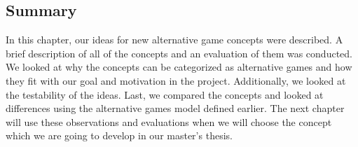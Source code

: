 \documentclass[../Main.tex]{subfiles}
\begin{document}
\subsection{Summary}
In this chapter, our ideas for new alternative game concepts were described. A brief description of all of the concepts and an evaluation of them was conducted. We looked at why the concepts can be categorized as alternative games and how they fit with our goal and motivation in the project. Additionally, we looked at the testability of the ideas. Last, we compared the concepts and looked at differences using the alternative games model defined earlier. The next chapter will use these observations and evaluations when we will choose the concept which we are going to develop in our master’s thesis.

\biblio %
\end{document}
